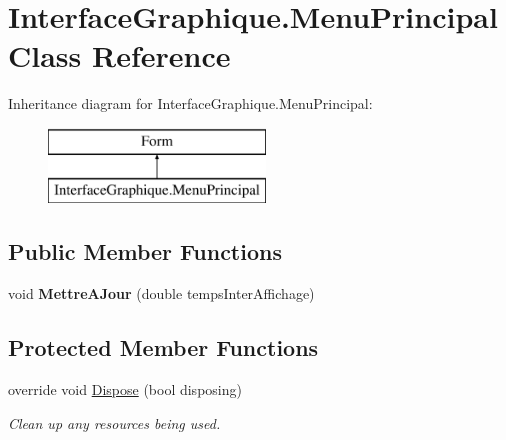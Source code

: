 \hypertarget{class_interface_graphique_1_1_menu_principal}{\section{Interface\-Graphique.\-Menu\-Principal Class Reference}
\label{class_interface_graphique_1_1_menu_principal}
}
Inheritance diagram for Interface\-Graphique.\-Menu\-Principal\-:\begin{figure}[H]
\begin{center}
\leavevmode
\includegraphics[height=2.000000cm]{class_interface_graphique_1_1_menu_principal}
\end{center}
\end{figure}
\subsection*{Public Member Functions}
\begin{DoxyCompactItemize}
\item 
\hypertarget{class_interface_graphique_1_1_menu_principal_a9597f3c586a63590d5c87cbe2cb16f7f}{void {\bfseries Mettre\-A\-Jour} (double temps\-Inter\-Affichage)}\label{class_interface_graphique_1_1_menu_principal_a9597f3c586a63590d5c87cbe2cb16f7f}

\end{DoxyCompactItemize}
\subsection*{Protected Member Functions}
\begin{DoxyCompactItemize}
\item 
override void \hyperlink{class_interface_graphique_1_1_menu_principal_a5a9389c7864e1b29b7520f77606d357d}{Dispose} (bool disposing)
\begin{DoxyCompactList}\small\item\em Clean up any resources being used. \end{DoxyCompactList}\end{DoxyCompactItemize}


